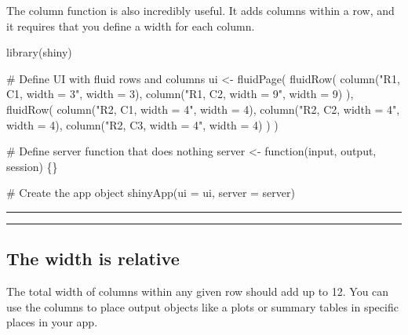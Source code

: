 \documentclass[
  letterpaper,
  DIV=11,
  numbers=noendperiod]{scrreprt}
\newenvironment{Shaded}{\begin{snugshade}}{\end{snugshade}}
\newcommand{\AttributeTok}[1]{\textcolor[rgb]{0.40,0.46,0.14}{#1}}
\newcommand{\CommentTok}[1]{\textcolor[rgb]{0.37,0.37,0.37}{#1}}
\newcommand{\ControlFlowTok}[1]{\textcolor[rgb]{0.00,0.46,0.62}{#1}}
\newcommand{\DecValTok}[1]{\textcolor[rgb]{0.68,0.00,0.00}{#1}}
\newcommand{\FunctionTok}[1]{\textcolor[rgb]{0.28,0.35,0.67}{#1}}
\newcommand{\NormalTok}[1]{\textcolor[rgb]{0.00,0.46,0.62}{#1}}
\newcommand{\OtherTok}[1]{\textcolor[rgb]{0.00,0.46,0.62}{#1}}
\newcommand{\StringTok}[1]{\textcolor[rgb]{0.13,0.47,0.30}{#1}}
\begin{document}
The column function is also incredibly useful. It adds columns within a
row, and it requires that you define a width for each column.

\begin{Shaded}
\begin{Highlighting}[]
\FunctionTok{library}\NormalTok{(shiny)}

\CommentTok{\# Define UI with fluid rows and columns}
\NormalTok{ui }\OtherTok{\textless{}{-}} \FunctionTok{fluidPage}\NormalTok{(}
  \FunctionTok{fluidRow}\NormalTok{(}
    \FunctionTok{column}\NormalTok{(}\StringTok{"R1, C1, width = 3"}\NormalTok{, }\AttributeTok{width =} \DecValTok{3}\NormalTok{),}
    \FunctionTok{column}\NormalTok{(}\StringTok{"R1, C2, width = 9"}\NormalTok{, }\AttributeTok{width =} \DecValTok{9}\NormalTok{)}
\NormalTok{  ),}
  \FunctionTok{fluidRow}\NormalTok{(}
    \FunctionTok{column}\NormalTok{(}\StringTok{"R2, C1, width = 4"}\NormalTok{, }\AttributeTok{width =} \DecValTok{4}\NormalTok{),}
    \FunctionTok{column}\NormalTok{(}\StringTok{"R2, C2, width = 4"}\NormalTok{, }\AttributeTok{width =} \DecValTok{4}\NormalTok{),}
    \FunctionTok{column}\NormalTok{(}\StringTok{"R2, C3, width = 4"}\NormalTok{, }\AttributeTok{width =} \DecValTok{4}\NormalTok{)}
\NormalTok{  )}
\NormalTok{)}

\CommentTok{\# Define server function that does nothing}
\NormalTok{server }\OtherTok{\textless{}{-}} \ControlFlowTok{function}\NormalTok{(input, output, session) \{\}}

\CommentTok{\# Create the app object}
\FunctionTok{shinyApp}\NormalTok{(}\AttributeTok{ui =}\NormalTok{ ui, }\AttributeTok{server =}\NormalTok{ server)}
\end{Highlighting}
\end{Shaded}

\begin{center}\rule{0.5\linewidth}{0.5pt}\end{center}

\begin{center}\rule{0.5\linewidth}{0.5pt}\end{center}

\hypertarget{the-width-is-relative}{%
\subsection{The width is relative}\label{the-width-is-relative}}

The total width of columns within any given row should add up to 12. You
can use the columns to place output objects like a plots or summary
tables in specific places in your app.
\end{document}
